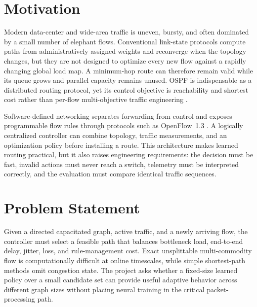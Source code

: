 \documentclass[12pt,a4paper,oneside]{report}
\begin{document}
\section{Motivation}
Modern data-center and wide-area traffic is uneven, bursty, and often dominated by a small number of elephant flows. Conventional link-state protocols compute paths from administratively assigned weights and reconverge when the topology changes, but they are not designed to optimize every new flow against a rapidly changing global load map. A minimum-hop route can therefore remain valid while its queue grows and parallel capacity remains unused. OSPF is indispensable as a distributed routing protocol, yet its control objective is reachability and shortest cost rather than per-flow multi-objective traffic engineering \cite{moy1998ospf}.

Software-defined networking separates forwarding from control and exposes programmable flow rules through protocols such as OpenFlow~1.3 \cite{mckeown2008openflow,onf2012openflow}. A logically centralized controller can combine topology, traffic measurements, and an optimization policy before installing a route. This architecture makes learned routing practical, but it also raises engineering requirements: the decision must be fast, invalid actions must never reach a switch, telemetry must be interpreted correctly, and the evaluation must compare identical traffic sequences.

\section{Problem Statement}
Given a directed capacitated graph, active traffic, and a newly arriving flow, the controller must select a feasible path that balances bottleneck load, end-to-end delay, jitter, loss, and rule-management cost. Exact unsplittable multi-commodity flow is computationally difficult at online timescales, while simple shortest-path methods omit congestion state. The project asks whether a fixed-size learned policy over a small candidate set can provide useful adaptive behavior across different graph sizes without placing neural training in the critical packet-processing path.
\end{document}
